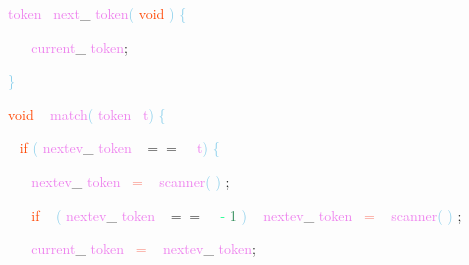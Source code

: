\documentclass[8, usernames, dvipsnames]{beamer}
\begin{document}
\begin{frame}
\textcolor{Violet}{token}\textcolor{White}{\ }
\textcolor{Violet}{next}\textcolor{Sepia}{\_}
\textcolor{Violet}{token}\textcolor{SkyBlue}{(}
\textcolor{OrangeRed}{void}
\textcolor{SkyBlue}{)}
\textcolor{SkyBlue}{\{ }

 \textcolor{White}{\   }
\textcolor{OrangeRed}{	}
\textcolor{White}{\ }
\textcolor{Violet}{current}\textcolor{Sepia}{\_}
\textcolor{Violet}{token}\textcolor{Sepia}{;}

 \textcolor{SkyBlue}{\} }

 
 \textcolor{OrangeRed}{void}
\textcolor{White}{\ }
\textcolor{Violet}{match}\textcolor{SkyBlue}{(}
\textcolor{Violet}{token}\textcolor{White}{\ }
\textcolor{Violet}{t}\textcolor{SkyBlue}{)}
\textcolor{SkyBlue}{\{ }

 \textcolor{White}{\   }
\textcolor{OrangeRed}{if}
\textcolor{SkyBlue}{(}
\textcolor{Violet}{nextev}\textcolor{Sepia}{\_}
\textcolor{Violet}{token}\textcolor{White}{\ }
\textcolor{OliveGreen}{$==$}
\textcolor{White}{\ }
\textcolor{Violet}{t}\textcolor{SkyBlue}{)}
\textcolor{SkyBlue}{\{ }

 \textcolor{White}{\   }
\textcolor{White}{\   }
\textcolor{Violet}{nextev}\textcolor{Sepia}{\_}
\textcolor{Violet}{token}\textcolor{White}{\ }
\textcolor{Salmon}{=}
\textcolor{White}{\ }
\textcolor{Violet}{scanner}\textcolor{SkyBlue}{(}
\textcolor{SkyBlue}{)}
\textcolor{Sepia}{;}

 \textcolor{White}{\   }
\textcolor{White}{\   }
\textcolor{OrangeRed}{if}
\textcolor{White}{\ }
\textcolor{SkyBlue}{(}
\textcolor{Violet}{nextev}\textcolor{Sepia}{\_}
\textcolor{Violet}{token}\textcolor{White}{\ }
\textcolor{OliveGreen}{$==$}
\textcolor{White}{\ }
\textcolor{SpringGreen}{-}
\textcolor{SeaGreen}{1}
\textcolor{SkyBlue}{)}
\textcolor{White}{\ }
\textcolor{Violet}{nextev}\textcolor{Sepia}{\_}
\textcolor{Violet}{token}\textcolor{White}{\ }
\textcolor{Salmon}{=}
\textcolor{White}{\ }
\textcolor{Violet}{scanner}\textcolor{SkyBlue}{(}
\textcolor{SkyBlue}{)}
\textcolor{Sepia}{;}

 \textcolor{White}{\   }
\textcolor{White}{\   }
\textcolor{Violet}{current}\textcolor{Sepia}{\_}
\textcolor{Violet}{token}\textcolor{White}{\ }
\textcolor{Salmon}{=}
\textcolor{White}{\ }
\textcolor{Violet}{nextev}\textcolor{Sepia}{\_}
\textcolor{Violet}{token}\textcolor{Sepia}{;}

 
 \end{frame}
\end{document}
